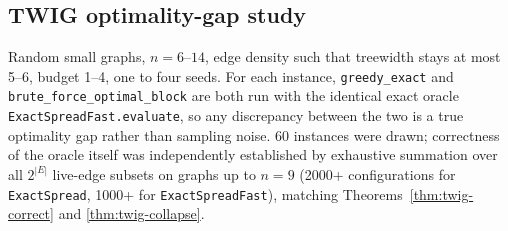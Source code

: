 \documentclass[ijoc,sglanonrev]{informs4}
\begin{document}
\subsection{TWIG optimality-gap study}
Random small graphs, $n=6$--$14$, edge density such that treewidth stays at
most 5--6, budget 1--4, one to four seeds. For each instance,
\texttt{greedy\_exact} and \texttt{brute\_force\_optimal\_block} are both
run with the identical exact oracle \texttt{ExactSpreadFast.evaluate}, so
any discrepancy between the two is a true optimality gap rather than
sampling noise. 60 instances were drawn; correctness of the oracle itself
was independently established by exhaustive summation over all $2^{|E|}$
live-edge subsets on graphs up to $n=9$ (2000+ configurations for
\texttt{ExactSpread}, 1000+ for \texttt{ExactSpreadFast}), matching
Theorems~\ref{thm:twig-correct} and \ref{thm:twig-collapse}.
\end{document}
